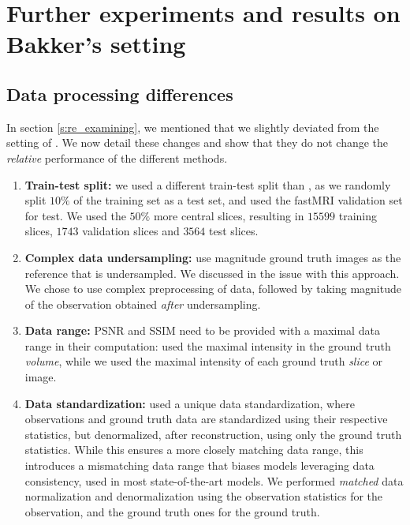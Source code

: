 \clearpage
\FloatBarrier

\section{Further experiments and results on Bakker's setting}
\subsection{Data processing differences}\label{app:bakker_pipeline_ablation}\label{app:bakker_mismatch}
In section \ref{s:re_examining}, we mentioned that we slightly deviated from the setting of \cite{bakker2020experimental}. We now detail these changes and show that they do not change the \textit{relative} performance of the different methods. 
\begin{enumerate}
    \item \textbf{Train-test split:} we used a different train-test split than \cite{bakker2020experimental}, as we randomly split $10\%$ of the training set as a test set, and used the fastMRI validation set for test. We used the $50\%$ more central slices, resulting in $15599$ training slices, $1743$ validation slices and $3564$ test slices.
    \item \textbf{Complex data undersampling:} \cite{bakker2020experimental} use magnitude ground truth images as the reference that is undersampled. We discussed in  the issue with this approach. We chose to use complex preprocessing of data, followed by taking magnitude of the observation obtained \textit{after} undersampling. 
    \item \textbf{Data range: }PSNR and SSIM need to be provided with a maximal data range in their computation: \cite{bakker2020experimental} used the maximal intensity in the ground truth  \textit{volume}, while we used the maximal intensity of each ground truth \textit{slice} or image.
    \item \textbf{Data standardization:} \cite{bakker2020experimental} used a unique data standardization, where observations and ground truth data are standardized using their respective statistics, but denormalized, after reconstruction, using only the ground truth statistics. While this ensures a more closely matching data range, this introduces a mismatching data range that biases models leveraging data consistency, used in most state-of-the-art models. We performed \textit{matched} data normalization and denormalization using the observation statistics for the observation, and the ground truth ones for the ground truth. 
\end{enumerate}

